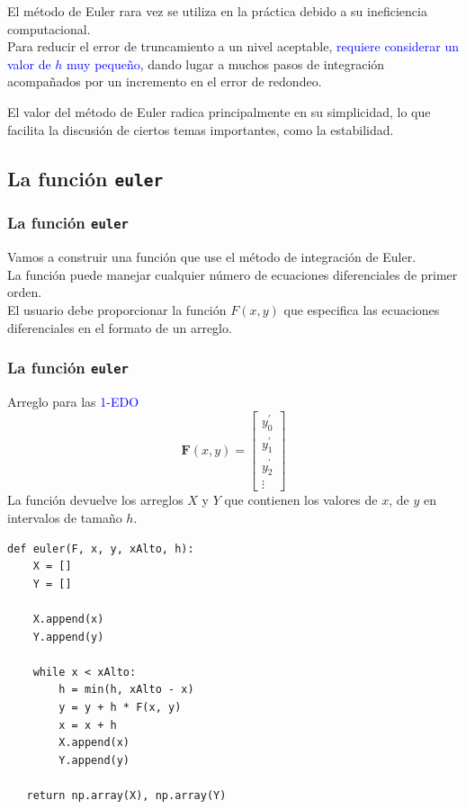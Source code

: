 \begin{frame}
El método de Euler rara vez se utiliza en la práctica debido a su ineficiencia computacional.
\\
\bigskip
Para reducir el error de truncamiento a un nivel aceptable, \textcolor{blue}{requiere considerar un valor de $h$ muy pequeño}, dando lugar a muchos pasos de integración acompañados por un incremento en el error de redondeo.
\end{frame}
\begin{frame}
El valor del método de Euler radica principalmente en su simplicidad, lo que facilita la discusión de ciertos temas importantes, como la estabilidad.
\end{frame}
\subsection{La función \texttt{euler}}
\begin{frame}
\frametitle{La función \texttt{euler}}
Vamos a construir una función que use el método de integración de Euler.
\\
\medskip
La función puede manejar cualquier número de ecuaciones diferenciales de primer orden. 
\\
\bigskip
El usuario debe proporcionar la función $F(x, y)$ que especifica las ecuaciones diferenciales en el formato de un arreglo.
\end{frame}
\begin{frame}
\frametitle{La función \texttt{euler}}
Arreglo para las \textcolor{blue}{1-EDO}
\[ \mathbf{F}(x,y) =
\begin{bmatrix}
y^{\prime}_{0} \\
y^{\prime}_{1} \\
y^{\prime}_{2} \\
\vdots
\end{bmatrix} \]
La función devuelve los arreglos $X$ y $Y$ que contienen los valores de $x$, de $y$ en intervalos de tamaño $h$.
\end{frame}
\begin{frame}[fragile]
\begin{lstlisting}[caption=La función euler, style=FormattedNumber, basicstyle=\linespread{1.1}\ttfamily=\small, columns=fullflexible]
def euler(F, x, y, xAlto, h):
    X = []
    Y = []

    X.append(x)
    Y.append(y)
    
    while x < xAlto:
        h = min(h, xAlto - x)
        y = y + h * F(x, y)
        x = x + h
        X.append(x)
        Y.append(y)
   
   return np.array(X), np.array(Y)
\end{lstlisting}
\end{frame}
